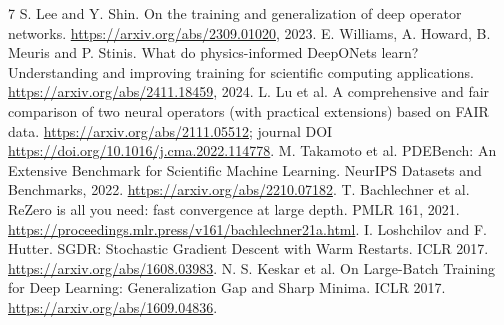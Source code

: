 \documentclass[10pt]{article}
\begin{document}
\begin{thebibliography}{7}
 S. Lee and Y. Shin.
On the training and generalization of deep operator networks.
\url{https://arxiv.org/abs/2309.01020}, 2023.
 E. Williams, A. Howard, B. Meuris and P. Stinis.
What do physics-informed DeepONets learn? Understanding and improving training
for scientific computing applications. \url{https://arxiv.org/abs/2411.18459}, 2024.
 L. Lu et al.
A comprehensive and fair comparison of two neural operators (with practical extensions)
based on FAIR data. \url{https://arxiv.org/abs/2111.05512};
journal DOI \url{https://doi.org/10.1016/j.cma.2022.114778}.
 M. Takamoto et al.
PDEBench: An Extensive Benchmark for Scientific Machine Learning.
NeurIPS Datasets and Benchmarks, 2022. \url{https://arxiv.org/abs/2210.07182}.
 T. Bachlechner et al.
ReZero is all you need: fast convergence at large depth.
PMLR 161, 2021. \url{https://proceedings.mlr.press/v161/bachlechner21a.html}.
 I. Loshchilov and F. Hutter.
SGDR: Stochastic Gradient Descent with Warm Restarts.
ICLR 2017. \url{https://arxiv.org/abs/1608.03983}.
 N. S. Keskar et al.
On Large-Batch Training for Deep Learning: Generalization Gap and Sharp Minima.
ICLR 2017. \url{https://arxiv.org/abs/1609.04836}.
\end{thebibliography}
\end{document}
